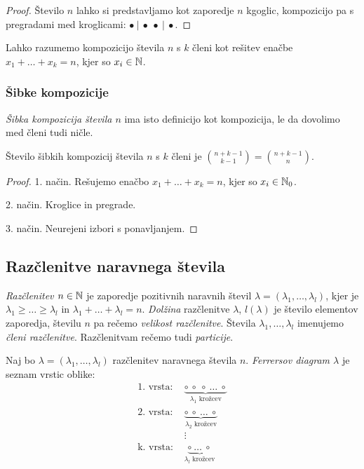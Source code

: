 \begin{proof}
    Število $n$ lahko si predstavljamo kot zaporedje $n$ kgoglic, kompozicijo pa s pregradami med kroglicami: $\bullet~|~\bullet~\bullet~|~\bullet$.
\end{proof}

\begin{opomba}
    Lahko razumemo kompozicijo števila $n$ s $k$ členi kot rešitev enačbe $x_1 + \ldots + x_k = n$, kjer so $x_i \in \mathbb{N}$.
\end{opomba}

\subsubsection{Šibke kompozicije}
\emph{Šibka kompozicija števila $n$} ima isto definicijo kot kompozicija, le da dovolimo med členi tudi ničle.

\begin{trditev}
    Število šibkih kompozicij števila $n$ s $k$ členi je $\binom{n+k-1}{k-1} = \binom{n+k-1}{n}$.
\end{trditev}

\begin{proof}
    1. način. Rešujemo enačbo $x_1 + \ldots + x_k = n$, kjer so $x_i \in \mathbb{N}_0$.

    2. način. Kroglice in pregrade.

    3. način. Neurejeni izbori s ponavljanjem.
\end{proof}

\subsection{Razčlenitve naravnega števila}
\begin{definicija}
    \emph{Razčlenitev $n \in \mathbb{N}$} je zaporedje pozitivnih naravnih števil $\lambda = (\lambda_1, \ldots, \lambda_l)$, kjer je $\lambda_1 \geq \ldots \geq \lambda_l$ in $\lambda_1 + \ldots + \lambda_l = n$. \emph{Dolžina} razčlenitve $\lambda$, $l(\lambda)$ je število elementov zaporedja, številu $n$ pa rečemo \emph{velikost razčlenitve}. Števila $\lambda_1, \ldots, \lambda_l$ imenujemo \emph{členi razčlenitve}. Razčlenitvam rečemo tudi \emph{particije}.
\end{definicija}

\begin{definicija}
    Naj bo $\lambda = (\lambda_1, \ldots, \lambda_l)$ razčlenitev naravnega števila $n$. \emph{Ferrersov diagram $\lambda$} je seznam vrstic oblike:
    \begin{align*}
        \text{1. vrsta: } &\underbrace{\circ \ \circ \ \circ \ \ldots \ \circ}_{\lambda_1 \text{ krožcev}} \\
        \text{2. vrsta: } &\underbrace{\circ \ \circ \ \ldots \ \circ}_{\lambda_2 \text{ krožcev}} \\
        &\vdots \\
        \text{k. vrsta: } &\underbrace{\circ \ \ldots \ \circ}_{\lambda_l \text{ krožcev}}
    \end{align*}
\end{definicija}

